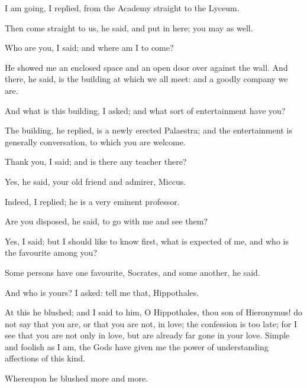 \documentclass[11pt,letter]{article}
\begin{document}
\par  I am going, I replied, from the Academy straight to the Lyceum.

\par  Then come straight to us, he said, and put in here; you may as well.

\par  Who are you, I said; and where am I to come?

\par  He showed me an enclosed space and an open door over against the wall. And there, he said, is the building at which we all meet: and a goodly company we are.

\par  And what is this building, I asked; and what sort of entertainment have you?

\par  The building, he replied, is a newly erected Palaestra; and the entertainment is generally conversation, to which you are welcome.

\par  Thank you, I said; and is there any teacher there?

\par  Yes, he said, your old friend and admirer, Miccus.

\par  Indeed, I replied; he is a very eminent professor.

\par  Are you disposed, he said, to go with me and see them?

\par  Yes, I said; but I should like to know first, what is expected of me, and who is the favourite among you?

\par  Some persons have one favourite, Socrates, and some another, he said.

\par  And who is yours? I asked: tell me that, Hippothales.

\par  At this he blushed; and I said to him, O Hippothales, thou son of Hieronymus! do not say that you are, or that you are not, in love; the confession is too late; for I see that you are not only in love, but are already far gone in your love. Simple and foolish as I am, the Gods have given me the power of understanding affections of this kind.

\par  Whereupon he blushed more and more.
\end{document}
